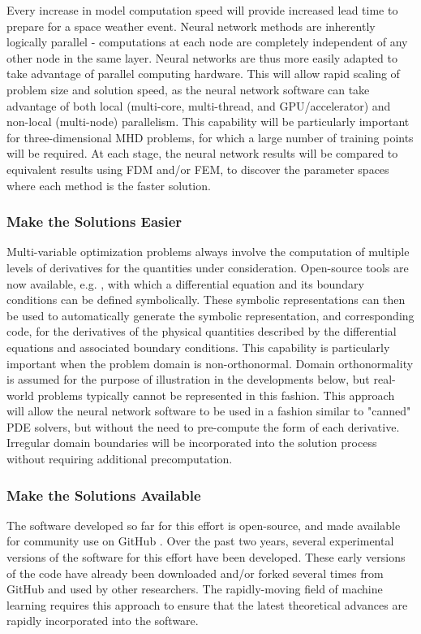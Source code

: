 \documentclass{article}
\begin{document}
Every increase in model computation speed will provide increased lead time to prepare for a space weather event. Neural network methods are inherently logically parallel - computations at each node are completely independent of any other node in the same layer. Neural networks are thus more easily adapted to take advantage of parallel computing hardware. This will allow rapid scaling of problem size and solution speed, as the neural network software can take advantage of both local (multi-core, multi-thread, and GPU/accelerator) and non-local (multi-node) parallelism. This capability will be particularly important for three-dimensional MHD problems, for which a large number of training points will be required. At each stage, the neural network results will be compared to equivalent results using FDM and/or FEM, to discover the parameter spaces where each method is the faster solution.

\subsubsection{Make the Solutions Easier}

Multi-variable optimization problems always involve the computation of multiple levels of derivatives for the quantities under consideration. Open-source tools are now available, e.g. \cite{sympy}, with which a differential equation and its boundary conditions can be defined symbolically. These symbolic representations can then be used to automatically generate the symbolic representation, and corresponding code, for the derivatives of the physical quantities described by the differential equations and associated boundary conditions. This capability is particularly important when the problem domain is non-orthonormal. Domain orthonormality is assumed for the purpose of illustration in the developments below, but real-world problems typically cannot be represented in this fashion. This approach will allow the neural network software to be used in a fashion similar to "canned" PDE solvers, but without the need to pre-compute the form of each derivative. Irregular domain boundaries will be incorporated into the solution process without requiring additional precomputation.

\subsubsection{Make the Solutions Available}

The software developed so far for this effort \cite{nnode} is open-source, and made available for community use on GitHub \cite{github}. Over the past two years, several experimental versions of the software for this effort have been developed. These early versions of the code have already been downloaded and/or forked several times from GitHub and used by other researchers. The rapidly-moving field of machine learning requires this approach to ensure that the latest theoretical advances are rapidly incorporated into the software.
\end{document}
